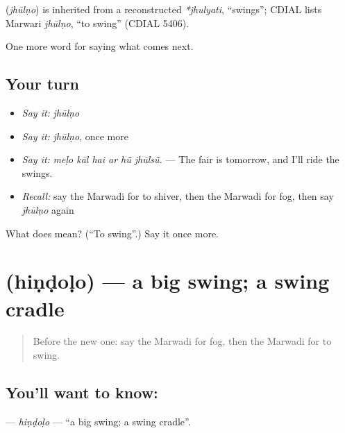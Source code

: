\begin{cousinweb}
\textbf{} (\emph{jhūlṇo}) is inherited from a reconstructed \emph{*jhulyati}, \textquotedblleft{}swings\textquotedblright{}; CDIAL lists Marwari \emph{jhūlṇo}, \textquotedblleft{}to swing\textquotedblright{} (CDIAL 5406).
\end{cousinweb}

\begin{grammarlens}[title={What you've built}]
One more word for saying what comes next.
\end{grammarlens}

\subsection*{Your turn}
\begin{itemize}
\raggedright
  \item \emph{Say it:} \emph{jhūlṇo}
  \item \emph{Say it:} \emph{jhūlṇo}, once more
  \item \emph{Say it:} \emph{meḷo kāl hai ar hū̃ jhūlsū̃.} — The fair is tomorrow, and I'll ride the swings.
  \item \emph{Recall:} say the Marwadi for to shiver, then the Marwadi for fog, then say \emph{jhūlṇo} again
\end{itemize}

\begin{tcolorbox}[breakable,colback=teal!4,colframe=teal!35!black,title={Before you move on}]
What does  mean? (\textquotedblleft{}To swing\textquotedblright{}.) Say it once more.
\end{tcolorbox}
\section[\texorpdfstring{\mw{हिंडोळो} (hiṇḍoḷo)}{हिंडोळो (hiṇḍoḷo)}]{ (hiṇḍoḷo) — a big swing; a swing cradle}

\label{lesson:MW-C223-hindolo}



\begin{quote}
Before the new one: say the Marwadi for fog, then the Marwadi for to swing.
\end{quote}

\subsection*{You'll want to know: }
\textbf{} — \emph{hiṇḍoḷo} — \textquotedblleft{}a big swing; a swing cradle\textquotedblright{}.

